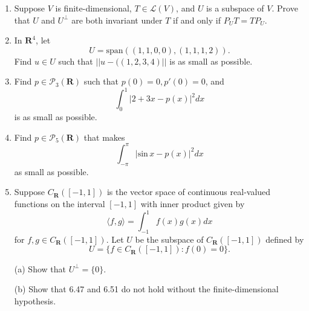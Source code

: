 \documentclass{book}
\begin{document}
\begin{enumerate}
\item Suppose \(V\) is finite-dimensional, \(T \in \mathcal{L}(V)\), and \(U\) is a subspace of \(V\).  Prove that \(U\) and \(U^{\perp}\) are both invariant under \(T\) if and only if \(P_UT=TP_U\).

\item In \(\textbf{R}^4\), let \[U=\textrm{span}((1,1,0,0),(1,1,1,2)).\] Find \(u \in U\) such that \(||u-((1,2,3,4)||\) is as small as possible.

\item Find \(p \in \mathcal{P}_3(\textbf{R})\) such that \(p(0)=0,p'(0)=0\), and \[\int_{0}^{1} |2+3x-p(x)|^2 dx\] is as small as possible.

\item Find \(p \in \mathcal{P}_5(\textbf{R})\) that makes \[\int_{-\pi}^{\pi} |\textrm{sin} \, x-p(x)|^2 dx\] as small as possible.

\item Suppose \(C_{\textbf{R}}([-1,1])\) is the vector space of continuous real-valued functions on the interval \([-1,1]\) with inner product given by \[\langle f,g \rangle = \int_{-1}^{1} f(x)g(x) dx\] for \(f,g \in C_{\textbf{R}}([-1,1])\).  Let \(U\) be the subspace of \(C_{\textbf{R}}([-1,1])\) defined by \[U=\{f \in C_{\textbf{R}}([-1,1]): f(0)=0\}.\]

(a) Show that \(U^{\perp}=\{0\}\).

(b) Show that 6.47 and 6.51 do not hold without the finite-dimensional hypothesis.

\end{enumerate}
\end{document}
